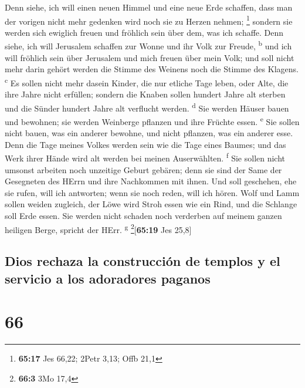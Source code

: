  Denn siehe, ich will einen neuen Himmel und eine neue
Erde schaffen, dass man der vorigen nicht mehr gedenken wird noch sie zu
Herzen nehmen; \footnote{\textbf{65:17} Jes 66,22; 2Petr 3,13; Offb 21,1}
 sondern sie werden sich ewiglich freuen und fröhlich
sein über dem, was ich schaffe. Denn siehe, ich will Jerusalem schaffen
zur Wonne und ihr Volk zur Freude, \textsuperscript{b} 
und ich will fröhlich sein über Jerusalem und mich freuen über mein
Volk; und soll nicht mehr darin gehört werden die Stimme des Weinens
noch die Stimme des Klagens. \textsuperscript{c}  Es
sollen nicht mehr dasein Kinder, die nur etliche Tage leben, oder Alte,
die ihre Jahre nicht erfüllen; sondern die Knaben sollen hundert Jahre
alt sterben und die Sünder hundert Jahre alt verflucht werden.
\textsuperscript{d}  Sie werden Häuser bauen und
bewohnen; sie werden Weinberge pflanzen und ihre Früchte essen.
\textsuperscript{e}  Sie sollen nicht bauen, was ein
anderer bewohne, und nicht pflanzen, was ein anderer esse. Denn die Tage
meines Volkes werden sein wie die Tage eines Baumes; und das Werk ihrer
Hände wird alt werden bei meinen Auserwählten. \textsuperscript{f}
 Sie sollen nicht umsonst arbeiten noch unzeitige Geburt
gebären; denn sie sind der Same der Gesegneten des HErrn und ihre
Nachkommen mit ihnen.  Und soll geschehen, ehe sie rufen,
will ich antworten; wenn sie noch reden, will ich hören. 
Wolf und Lamm sollen weiden zugleich, der Löwe wird Stroh essen wie ein
Rind, und die Schlange soll Erde essen. Sie werden nicht schaden noch
verderben auf meinem ganzen heiligen Berge, spricht der HErr.
\textsuperscript{g} \footnote{\textbf{66:3} 3Mo 17,4}{[}\textbf{65:19}
Jes 25,8{]}

\hypertarget{dios-rechaza-la-construcciuxf3n-de-templos-y-el-servicio-a-los-adoradores-paganos}{%
\subsection{Dios rechaza la construcción de templos y el servicio a los
adoradores
paganos}\label{dios-rechaza-la-construcciuxf3n-de-templos-y-el-servicio-a-los-adoradores-paganos}}

\hypertarget{section-65}{%
\section{66}\label{section-65}}

